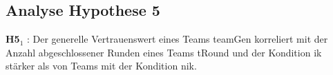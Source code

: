 \documentclass[a4paper,11pt]{article}%
\renewcommand{\\}{\vspace*{0.5\baselineskip} \newline}
\begin{document}
%

\newpage
	\subsection{Analyse Hypothese 5}





\textbf{H5$_{1}$} : Der generelle Vertrauenswert eines Teams \ac{teamGen} korreliert mit der Anzahl abgeschlossener Runden eines Teams \ac{tRound} und der Kondition \ac{ik} stärker als von Teams mit der Kondition \ac{nik}. \\
\end{document}
